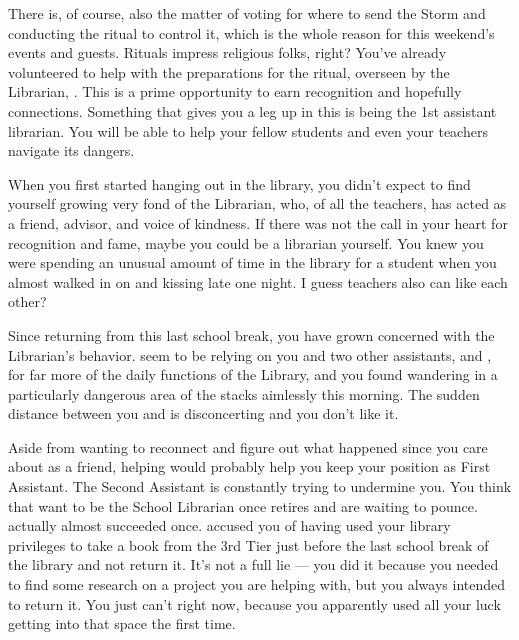 \documentclass[char]{GL2020}
\begin{document}
There is, of course, also the matter of voting for where to send the Storm and conducting the ritual to control it, which is the whole reason for this weekend's events and guests. Rituals impress religious folks, right? You've already volunteered to help with the preparations for the ritual, overseen by the Librarian, \cLibrarian{\intro}. This is a prime opportunity to earn recognition and hopefully connections. Something that gives you a leg up in this is being the 1st assistant librarian. You will be able to help your fellow students and even your teachers navigate its dangers.

 When you first started hanging out in the library, you didn’t expect to find yourself growing very fond of the Librarian, who, of all the teachers, has acted as a friend, advisor, and voice of kindness. If there was not the call in your heart for recognition and fame, maybe you could be a librarian yourself. You knew you were spending an unusual amount of time in the library for a student when you almost walked in on \cInterpol{\full} and \cLibrarian{} kissing late one night. I guess teachers also can like each other?

 Since returning from this last school break, you have grown concerned with the Librarian’s behavior. \cLibrarian{\They} seem\cLibrarian{\verbs} to be relying on you and \cLibrarian{\their} two other assistants, \cPresident{\full} and \cLibAssist{\full}, for far more of the daily functions of the Library, and you found \cLibrarian{\them} wandering in a particularly dangerous area of the stacks aimlessly this morning.  The sudden distance between you and \cLibrarian{} is disconcerting and you don’t like it. 

Aside from wanting to reconnect and figure out what happened since you care about \cLibrarian{} as a friend, helping  \cLibrarian{\them} would probably help you keep your position as First Assistant.  The Second Assistant \cLibAssist{\full} is constantly trying to undermine you. You think that \cLibAssist{\they} want to be the School Librarian once \cLibrarian{} retires and are waiting to pounce. \cLibAssist{\They} actually almost succeeded once. \cLibAssist{} accused you of having used your library privileges to take a book from the 3rd Tier just before the last school break of the library and not return it. It's not a full lie — you did it because you needed to find some research on a project you are helping \cFlowPriest{\full} with, but you always intended to return it. You just can’t right now, because you apparently used all your luck getting into that space the first time. 
\end{document}

